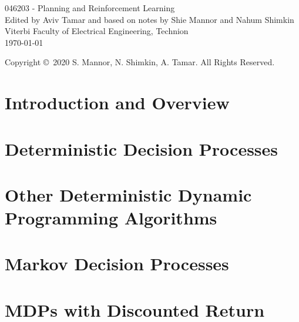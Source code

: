 \documentclass[11pt]{report}
\numberwithin{proposition}{chapter}
\numberwithin{corollary}{chapter}
\numberwithin{assumption}{chapter}
\numberwithin{lemma}{chapter}
\numberwithin{definition}{chapter}
\numberwithin{theorem}{chapter}
\numberwithin{example}{chapter}
\numberwithin{exercise}{chapter}
\numberwithin{remark}{chapter}
\numberwithin{algorithm_}{chapter}
\begin{document}
\begin{titlepage}
\begin{center}
\Huge{046203 - Planning and Reinforcement Learning}\\[1cm]
\Large{Edited by Aviv Tamar and based on notes by Shie Mannor and Nahum Shimkin}\\[5cm]
\large{Viterbi Faculty of Electrical Engineering, Technion\\{\today}}
\end{center}
\vfill
Copyright \copyright~2020 S. Mannor, N. Shimkin, A. Tamar. All Rights Reserved.
\end{titlepage}

\tableofcontents

\chapter{Introduction and Overview}


\chapter{Deterministic Decision Processes}


\chapter{Other Deterministic Dynamic Programming Algorithms}



\chapter{Markov Decision Processes}



\chapter{MDPs with Discounted Return}



% 
% 

% 
% 
\end{document}
